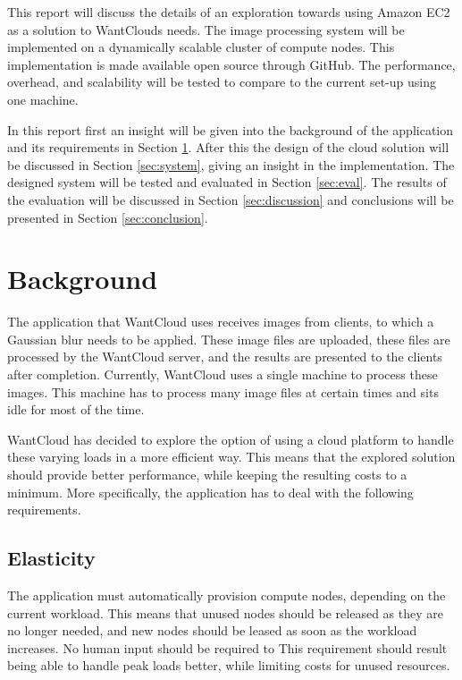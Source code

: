 \documentclass{acm_proc_article-sp}
\begin{document}
This report will discuss the details of an exploration towards using Amazon EC2\cite{web:ec2} as a solution to WantClouds needs.
The image processing system will be implemented on a dynamically scalable cluster of compute nodes.
This implementation is made available open source through GitHub\cite{web:git}.
The performance, overhead, and scalability will be tested to compare to the current set-up using one machine.

In this report first an insight will be given into the background of the application and its requirements in Section \ref{sec:bg}.
After this the design of the cloud solution will be discussed in Section \ref{sec:system}, giving an insight in the implementation.
The designed system will be tested and evaluated in Section \ref{sec:eval}.
The results of the evaluation will be discussed in Section \ref{sec:discussion} and conclusions will be presented in Section \ref{sec:conclusion}.

\section{Background}
\label{sec:bg}
The application that WantCloud uses receives images from clients, to which a Gaussian blur needs to be applied.
These image files are uploaded, these files are processed by the WantCloud server, and the results are presented to the clients after completion.
Currently, WantCloud uses a single machine to process these images.
This machine has to process many image files at certain times and sits idle for most of the time.

WantCloud has decided to explore the option of using a cloud platform to handle these varying loads in a more efficient way.
This means that the explored solution should provide better performance, while keeping the resulting costs to a minimum.
More specifically, the application has to deal with the following requirements.

\subsection{Elasticity}
The application must automatically provision compute nodes, depending on the current workload.
This means that unused nodes should be released as they are no longer needed, and new nodes should be leased as soon as the workload increases.
No human input should be required to 
This requirement should result being able to handle peak loads better, while limiting costs for unused resources.
\end{document}
